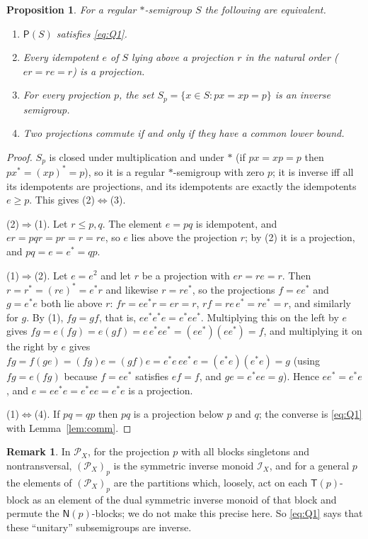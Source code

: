 \documentclass[11pt]{amsart}
\newtheorem{proposition}[theorem]{Proposition}
\theoremstyle{definition}
\newtheorem{remark}[theorem]{Remark}
\renewcommand{\P}{\mathcal{P}}      %
\newcommand{\PA}{\mathsf{P}}         %
\newcommand{\T}{\mathsf{T}}
\newcommand{\N}{\mathsf{N}}
\begin{document}
\begin{proposition}\label{prop:Q1}
For a regular $*$-semigroup $S$ the following are equivalent.
\begin{enumerate}[label=\textup{(\arabic*)}]
\item $\PA(S)$ satisfies \eqref{eq:Q1}.
\item Every idempotent $e$ of $S$ lying above a projection $r$ in the natural order ($er=re=r$) is a projection.
\item For every projection $p$, the set $S_p=\{x\in S: px=xp=p\}$ is an inverse semigroup.
\item Two projections commute if and only if they have a common lower bound.
\end{enumerate}
\end{proposition}

\begin{proof}
$S_p$ is closed under multiplication and under $*$ (if $px=xp=p$ then $px^*=(xp)^*=p$), so it is a regular $*$-semigroup with zero $p$; it is inverse iff all its idempotents are projections, and its idempotents are exactly the idempotents $e\ge p$. This gives (2)$\Leftrightarrow$(3).

(2)$\Rightarrow$(1). Let $r\le p,q$. The element $e=pq$ is idempotent, and $er=pqr=pr=r=re$, so $e$ lies above the projection $r$; by (2) it is a projection, and $pq=e=e^*=qp$.

(1)$\Rightarrow$(2). Let $e=e^2$ and let $r$ be a projection with $er=re=r$. Then $r=r^*=(re)^*=e^*r$ and likewise $r=re^*$, so the projections $f=ee^*$ and $g=e^*e$ both lie above $r$: $fr=ee^*r=er=r$, $rf=re\,e^*=re^*=r$, and similarly for $g$. By (1), $fg=gf$, that is, $ee^*e^*e=e^*ee^*$. Multiplying this on the left by $e$ gives $fg=e(fg)=e(gf)=e\,e^*ee^*=(ee^*)(ee^*)=f$, and multiplying it on the right by $e$ gives $fg=f(ge)=(fg)e=(gf)e=e^*e\,ee^*\,e=(e^*e)(e^*e)=g$ (using $fg=e(fg)$ because $f=ee^*$ satisfies $ef=f$, and $ge=e^*ee=g$). Hence $ee^*=e^*e$, and $e=ee^*e=e^*ee=e^*e$ is a projection.

(1)$\Leftrightarrow$(4). If $pq=qp$ then $pq$ is a projection below $p$ and $q$; the converse is \eqref{eq:Q1} with Lemma~\ref{lem:comm}.
\end{proof}

\begin{remark}\label{rem:Sp}
In $\P_X$, for the projection $p$ with all blocks singletons and nontransversal, $(\P_X)_p$ is the symmetric inverse monoid $\mathcal I_X$, and for a general $p$ the elements of $(\P_X)_p$ are the partitions which, loosely, act on each $\T(p)$-block as an element of the dual symmetric inverse monoid of that block and permute the $\N(p)$-blocks; we do not make this precise here. So \eqref{eq:Q1} says that these ``unitary'' subsemigroups are inverse.
\end{remark}
\end{document}
